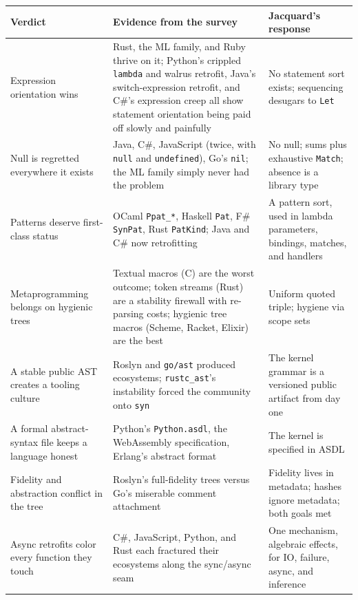 \documentclass[11pt]{article}
\newcommand{\jacquard}{Jacquard}
\begin{document}
\begin{table}[ht]
\centering
\small
\begin{tabularx}{\textwidth}{@{}p{}Xp{}@{}}
\toprule
\textbf{Verdict} & \textbf{Evidence from the survey} & \textbf{\jacquard's response} \\
\midrule
Expression orientation wins & Rust, the ML family, and Ruby thrive on it; Python's crippled \texttt{lambda} and walrus retrofit, Java's switch-expression retrofit, and C\#'s expression creep all show statement orientation being paid off slowly and painfully & No statement sort exists; sequencing desugars to \texttt{Let} \\
\addlinespace
Null is regretted everywhere it exists & Java, C\#, JavaScript (twice, with \texttt{null} and \texttt{undefined}), Go's \texttt{nil}; the ML family simply never had the problem & No null; sums plus exhaustive \texttt{Match}; absence is a library type \\
\addlinespace
Patterns deserve first-class status & OCaml \texttt{Ppat\_*}, Haskell \texttt{Pat}, F\# \texttt{SynPat}, Rust \texttt{PatKind}; Java and C\# now retrofitting & A pattern sort, used in lambda parameters, bindings, matches, and handlers \\
\addlinespace
Metaprogramming belongs on hygienic trees & Textual macros (C) are the worst outcome; token streams (Rust) are a stability firewall with re-parsing costs; hygienic tree macros (Scheme, Racket, Elixir) are the best & Uniform quoted triple; hygiene via scope sets \cite{flatt2016} \\
\addlinespace
A stable public AST creates a tooling culture & Roslyn and \texttt{go/ast} produced ecosystems; \texttt{rustc\_ast}'s instability forced the community onto \texttt{syn} & The kernel grammar is a versioned public artifact from day one \\
\addlinespace
A formal abstract-syntax file keeps a language honest & Python's \texttt{Python.asdl}, the WebAssembly specification, Erlang's abstract format & The kernel is specified in ASDL \cite{asdl} \\
\addlinespace
Fidelity and abstraction conflict in the tree & Roslyn's full-fidelity trees versus Go's miserable comment attachment & Fidelity lives in metadata; hashes ignore metadata; both goals met \\
\addlinespace
Async retrofits color every function they touch & C\#, JavaScript, Python, and Rust each fractured their ecosystems along the sync/async seam & One mechanism, algebraic effects, for IO, failure, async, and inference \\

\end{tabularx}
\end{table}
\end{document}
